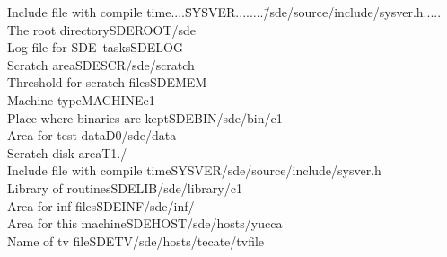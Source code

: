 {\samepage \clearpage \begin{tabbing}Include file with compile time....\=SYSVER........\=/sde/source/include/sysver.h.....\kill
The root directory\>SDEROOT\>/sde\\ 
Log file for {\sf SDE}\ tasks\>SDELOG\> \\ 
Scratch area\>SDESCR\>/sde/scratch\\ 
Threshold for scratch files\>SDEMEM\\ 
Machine type\>MACHINE\>c1\\ 
Place where binaries are kept\>SDEBIN\>/sde/bin/c1\\ 
Area for test data\>D0\>/sde/data\\ 
Scratch disk area\>T1\>./\\ 
Include file with compile time\>SYSVER\>/sde/source/include/sysver.h\\ 
Library of routines\>SDELIB\>/sde/library/c1\\ 
Area for inf files\>SDEINF\>/sde/inf/\\ 
Area for this machine\>SDEHOST\>/sde/hosts/yucca\\ 
Name of tv file\>SDETV\>/sde/hosts/tecate/tvfile
\end{tabbing}
}



